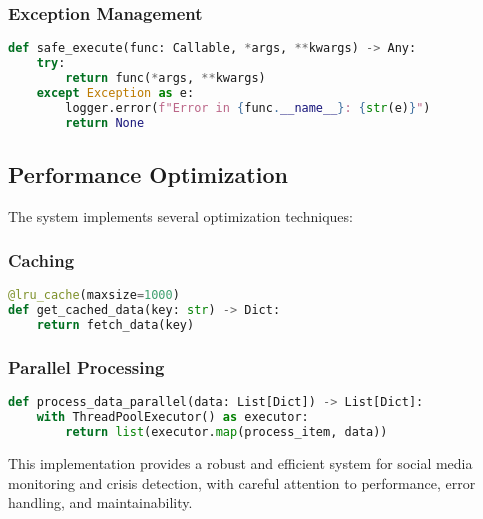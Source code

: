 \subsubsection{Exception Management}
\begin{lstlisting}[language=Python]
def safe_execute(func: Callable, *args, **kwargs) -> Any:
    try:
        return func(*args, **kwargs)
    except Exception as e:
        logger.error(f"Error in {func.__name__}: {str(e)}")
        return None
\end{lstlisting}

\subsection{Performance Optimization}
The system implements several optimization techniques:

\subsubsection{Caching}
\begin{lstlisting}[language=Python]
@lru_cache(maxsize=1000)
def get_cached_data(key: str) -> Dict:
    return fetch_data(key)
\end{lstlisting}

\subsubsection{Parallel Processing}
\begin{lstlisting}[language=Python]
def process_data_parallel(data: List[Dict]) -> List[Dict]:
    with ThreadPoolExecutor() as executor:
        return list(executor.map(process_item, data))
\end{lstlisting}

This implementation provides a robust and efficient system for social media monitoring and crisis detection, with careful attention to performance, error handling, and maintainability. 